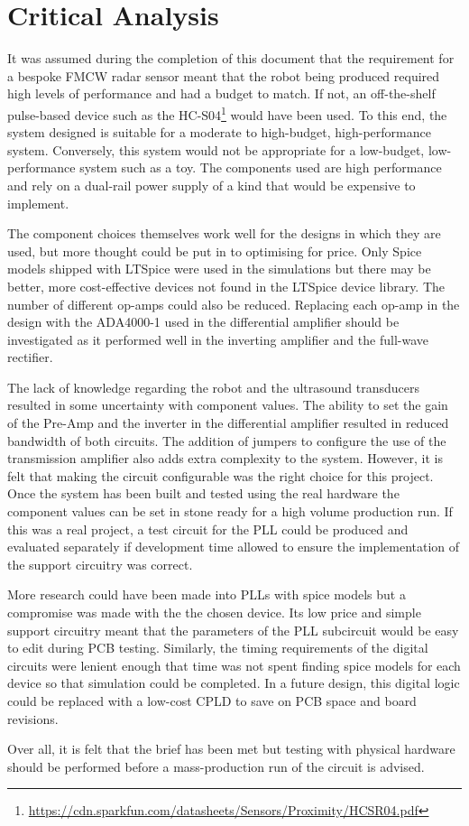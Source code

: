\section{Critical Analysis}
\label{sec:criticalAnalysis}

It was assumed during the completion of this document that the requirement for a bespoke FMCW radar sensor meant that the robot being produced required high levels of performance and had a budget to match.
If not, an off-the-shelf pulse-based device such as the HC-S04\footnote{\url{https://cdn.sparkfun.com/datasheets/Sensors/Proximity/HCSR04.pdf}} would have been used. 
To this end, the system designed is suitable for a moderate to high-budget, high-performance system.
Conversely, this system would not be appropriate for a low-budget, low-performance system such as a toy. 
The components used are high performance and rely on a dual-rail power supply of a kind that would be expensive to implement.  

The component choices themselves work well for the designs in which they are used, but more thought could be put in to optimising for price. 
Only Spice models shipped with LTSpice were used in the simulations but there may be better, more cost-effective devices not found in the LTSpice device library. 
The number of different op-amps could also be reduced. 
Replacing each op-amp in the design with the ADA4000-1 used in the differential amplifier should be investigated as it performed well in the inverting amplifier and the full-wave rectifier.

The lack of knowledge regarding the robot and the ultrasound transducers resulted in some uncertainty with component values.
The ability to set the gain of the Pre-Amp and the inverter in the differential amplifier resulted in reduced bandwidth of both circuits. 
The addition of jumpers to configure the use of the transmission amplifier also adds extra complexity to the system. 
However, it is felt that making the circuit configurable was the right choice for this project. 
Once the system has been built and tested using the real hardware the component values can be set in stone ready for a high volume production run. 
If this was a real project, a test circuit for the PLL could be produced and evaluated separately if development time allowed to ensure the implementation of the support circuitry was correct. 

More research could have been made into PLLs with spice models but a compromise was made with the the chosen device. 
Its low price and simple support circuitry meant that the parameters of the PLL subcircuit would be easy to edit during PCB testing. 
Similarly, the timing requirements of the digital circuits were lenient enough that time was not spent finding spice models for each device so that simulation could be completed. 
In a future design, this digital logic could be replaced with a low-cost CPLD to save on PCB space and board revisions. 

Over all, it is felt that the brief has been met but testing with physical hardware should be performed before a mass-production run of the circuit is advised.
 